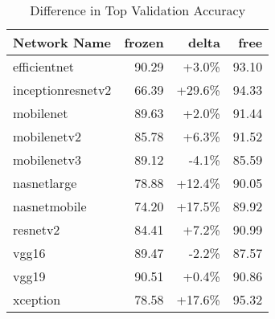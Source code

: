 \begin{table}[htb]
\centering

    \begin{tabular}{ l  r  r  r } \hline
    Network Name       & frozen & delta & free \\ \hline 
    efficientnet       & 90.29 &  +3.0\%  & 93.10 \\
    inceptionresnetv2  & 66.39 & +29.6\%  & 94.33 \\
    mobilenet          & 89.63 &  +2.0\%  & 91.44 \\
    mobilenetv2        & 85.78 &  +6.3\%  & 91.52 \\
    mobilenetv3        & 89.12 &  -4.1\%  & 85.59 \\
    nasnetlarge        & 78.88 & +12.4\%  & 90.05 \\
    nasnetmobile       & 74.20 & +17.5\%  & 89.92 \\
    resnetv2           & 84.41 &  +7.2\%  & 90.99 \\
    vgg16              & 89.47 &  -2.2\%  & 87.57 \\
    vgg19              & 90.51 &  +0.4\%  & 90.86 \\
    xception           & 78.58 & +17.6\%  & 95.32 \\ \hline 
    \end{tabular}

\caption{Difference in Top Validation Accuracy}
\label{tbl:training_diff}
\end{table}